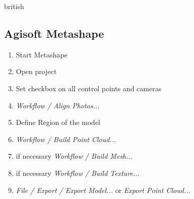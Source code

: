 \documentclass[./00PhotoBox.tex]{subfiles}
\begin{document}
\begin{otherlanguage*}{british}
    \subsection{Agisoft Metashape}
    \begin{enumerate}
        \item Start Metashape
        \item Open project
        \item Set checkbox on all control points and cameras
        \item \textit{Workflow / Align Photos...}
        \item Define Region of the model
        \item \textit{Workflow / Build Point Cloud...}
        \item if necessary \textit{Workflow / Build Mesh...}
        \item if necessary \textit{Workflow / Build Texture...}
        \item \textit{File / Export / Export Model...} or \textit{Export Point Cloud...}
    \end{enumerate}

\end{otherlanguage*}
\biblio
\end{document}

